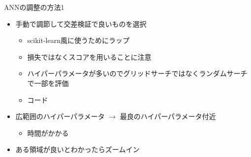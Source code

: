 \documentclass[aspectratio=169, dvipdfmx, 14pt, xcolor={svgnames,dvipsnames}]{beamer}
\def\tightlist{\itemsep1pt\parskip0pt\parsep0pt}
\begin{document}
\begin{frame}{\quad ANNの調整の方法1}
  \begin{itemize}
    \item
          手動で調節して交差検証で良いものを選択

          \begin{itemize}
            \tightlist
            \item
                  scikit-learn風に使うためにラップ
            \item
                  損失ではなくスコアを用いることに注意
            \item
                  ハイパーパラメータが多いのでグリッドサーチではなくランダムサーチで一部を評価
            \item
                  コード
          \end{itemize}
    \item
          広範囲のハイパーパラメータ $\rightarrow$ 最良のハイパーパラメータ付近

          \begin{itemize}
            \tightlist
            \item
                  時間がかかる
          \end{itemize}
    \item
          \alert{ある領域が良いとわかったらズームイン}
  \end{itemize}
\end{frame}

\end{document}
